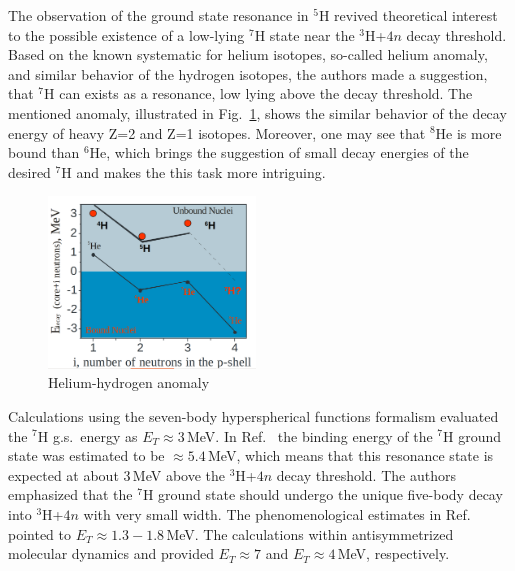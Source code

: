 The observation of the ground state resonance in $^{5}$H \cite{Korsheninnikov:2001} revived theoretical interest to the possible existence of a low-lying $^{7}$H  state near the $^{3}$H+$4n$ decay threshold.
Based on the known systematic for helium isotopes, so-called helium anomaly, and similar behavior of the hydrogen isotopes, the authors made a suggestion, that $^{7}$H can exists as a resonance, low lying above the decay threshold.   
The mentioned anomaly, illustrated in Fig.\ \ref{fig:helium_anomaly}, shows the similar behavior of the decay energy of heavy Z=2 and Z=1 isotopes. 
Moreover, one may see that $^{8}$He is more bound than $^{6}$He, which brings the suggestion of small decay energies of the desired $^{7}$H and makes the this task more intriguing.
\begin{figure}[t]
	\begin{center}
		\includegraphics[width=0.49\textwidth]{figures/anomalie.png}
	\end{center}
	\caption{Helium-hydrogen anomaly}
	\label{fig:helium_anomaly}
\end{figure}

\newpage

Calculations using the seven-body hyperspherical functions formalism \cite{Timofeyuk:2002} evaluated the $^{7}$H g.s.\ energy as $E_{T} \approx 3$\,MeV.
In Ref.\ \cite{Korsheninnikov:2003} the binding energy of the $^{7}$H ground state was estimated to be $\approx 5.4$\,MeV, which means that this resonance state is expected at about 3\,MeV above the $^3$H+$4n$ decay threshold.
The authors emphasized that the $^{7}$H ground state should undergo the unique five-body decay into $^3$H+$4n$ with very small width. 
The phenomenological estimates in Ref.\ \cite{Golovkov:2004} pointed to $E_{T} \approx 1.3-1.8$\,MeV.
The calculations within antisymmetrized molecular dynamics \cite{Aoyama:2004} and \cite{Aoyama:2009} provided $E_{T} \approx 7$ and $E_{T} \approx 4$\,MeV, respectively.

